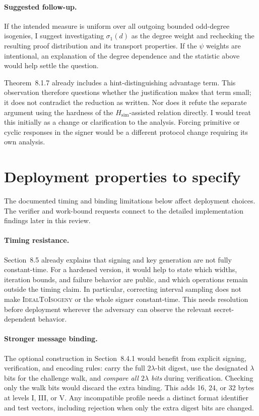 \documentclass[a4paper,11pt]{article}
\newcommand{\Hsim}{H_{\mathrm{sim}}}
\begin{document}
\paragraph{Suggested follow-up.}
If the intended measure is uniform over all outgoing bounded odd-degree
isogenies, I suggest investigating $\sigma_1(d)$ as the degree weight and
rechecking the resulting proof distribution and its transport properties.
If the $\psi$ weights are intentional, an explanation of the degree
dependence and the statistic above would help settle the question.

Theorem~8.1.7 already includes a hint-distinguishing advantage term. This
observation therefore questions whether the justification makes that term
small; it does not contradict the reduction as written. Nor does it refute
the separate argument using the hardness of the $\Hsim$-assisted relation
directly. I would treat this initially as a change or clarification to the
analysis. Forcing primitive or cyclic responses in the signer would be a
different protocol change requiring its own analysis.

\section{Deployment properties to specify}
\label{sec:related}

The documented timing and binding limitations below affect deployment
choices. The verifier and work-bound requests connect to the detailed
implementation findings later in this review.

\paragraph{Timing resistance.}
Section~8.5 already explains that signing and key generation are not fully
constant-time. For a hardened version, it would help to state which widths,
iteration bounds, and failure behavior are public, and which operations
remain outside the timing claim. In particular, correcting interval
sampling does not make \textsc{IdealToIsogeny} or the whole signer
constant-time. This needs resolution before deployment wherever the
adversary can observe the relevant secret-dependent behavior.

\paragraph{Stronger message binding.}
The optional construction in Section~8.4.1 would benefit from explicit
signing, verification, and encoding rules: carry the full $2\lambda$-bit
digest, use the designated $\lambda$ bits for the challenge walk, and
\emph{compare all $2\lambda$ bits} during verification. Checking only the
walk bits would discard the extra binding. This adds 16, 24, or 32 bytes
at levels I, III, or V. Any incompatible profile needs a distinct format
identifier and test vectors, including rejection when only the extra
digest bits are changed.
\end{document}
